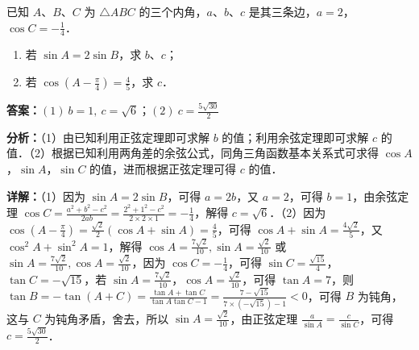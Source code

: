 \begin{question}[points=14]
已知 $A$、$B$、$C$ 为 $\triangle ABC$ 的三个内角，$a$、$b$、$c$ 是其三条边，$a=2$，$\cos C=-\frac{1}{4}$．\begin{enumerate}\item[(1)] 若 $\sin A=2\sin B$，求 $b$、$c$；\item[(2)] 若 $\cos(A-\frac{\pi}{4})=\frac{4}{5}$，求 $c$．\end{enumerate}
\begin{solution}
\textbf{答案：}$(1)\ b=1,\ c=\sqrt{6}$；$(2)\ c=\frac{5\sqrt{30}}{2}$

\textbf{分析：}（1）由已知利用正弦定理即可求解 $b$ 的值；利用余弦定理即可求解 $c$ 的值．\newline（2）根据已知利用两角差的余弦公式，同角三角函数基本关系式可求得 $\cos A$，$\sin A$，$\sin C$ 的值，进而根据正弦定理可得 $c$ 的值．

\textbf{详解：}（1）因为 $\sin A=2\sin B$，可得 $a=2b$，又 $a=2$，可得 $b=1$，由余弦定理 $\cos C=\frac{a^2+b^2-c^2}{2ab}=\frac{2^2+1^2-c^2}{2\times 2\times 1}=-\frac{1}{4}$，解得 $c=\sqrt{6}$．\newline（2）因为 $\cos(A-\frac{\pi}{4})=\frac{\sqrt{2}}{2}(\cos A+\sin A)=\frac{4}{5}$，可得 $\cos A+\sin A=\frac{4\sqrt{2}}{5}$，又 $\cos^2 A+\sin^2 A=1$，解得 $\cos A=\frac{7\sqrt{2}}{10},\sin A=\frac{\sqrt{2}}{10}$ 或 $\sin A=\frac{7\sqrt{2}}{10},\cos A=\frac{\sqrt{2}}{10}$，因为 $\cos C=-\frac{1}{4}$，可得 $\sin C=\frac{\sqrt{15}}{4}$，$\tan C=-\sqrt{15}$，若 $\sin A=\frac{7\sqrt{2}}{10}$，$\cos A=\frac{\sqrt{2}}{10}$，可得 $\tan A=7$，则 $\tan B=-\tan(A+C)=\frac{\tan A+\tan C}{\tan A\tan C-1}=\frac{7-\sqrt{15}}{7\times(-\sqrt{15})-1}<0$，可得 $B$ 为钝角，这与 $C$ 为钝角矛盾，舍去，所以 $\sin A=\frac{\sqrt{2}}{10}$，由正弦定理 $\frac{a}{\sin A}=\frac{c}{\sin C}$，可得 $c=\frac{5\sqrt{30}}{2}$．
\end{solution}
\end{question}


